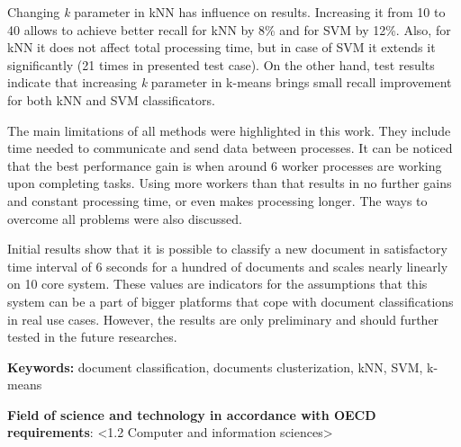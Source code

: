 Changing \textit{k} parameter in kNN has influence on results. Increasing it from 10 to 40 allows to achieve better recall for kNN by 8\% and for SVM by 12\%. Also, for kNN it does not affect total processing time, but in case of SVM it extends it significantly (21 times in presented test case). On the other hand, test results indicate that increasing \textit{k} parameter in k-means brings small recall improvement for both kNN and SVM classificators.

The main limitations of all methods were highlighted in this work. They include time needed to communicate and send data between processes. It can be noticed that the best performance gain is when around 6 worker processes are working upon completing tasks. Using more workers than that results in no further gains and constant processing time, or even makes processing longer. The ways to overcome all problems were also discussed.

Initial results show that it is possible to classify a new document in satisfactory time interval of 6 seconds for a hundred of documents and scales nearly linearly on 10 core system. These values are indicators for the assumptions that this system can be a part of bigger platforms that cope with document classifications in real use cases. However, the results are only preliminary and should further tested in the future researches.

\vspace{12pt}
\noindent\textbf{Keywords:} document classification, documents clusterization, kNN, SVM, k-means

\vspace{12pt}
\noindent\textbf{Field of science and technology in accordance with OECD requirements}: \textless{}1.2 Computer and information sciences\textgreater{}


